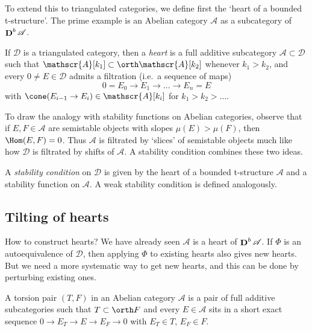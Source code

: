 To extend this to triangulated categories, we define first the `heart of a
bounded t-structure'. The prime example is an Abelian category \(\mathscr{A}\)
as a subcategory of \(\mathop{\mathbf{D}}^b \mathscr{A}\).

\begin{definition}
    If \(\mathscr{D}\) is a triangulated category, then a \textit{heart} is a
    full additive subcategory \(\mathscr{A}\subset \mathscr{D}\) such that
    \(\mathscr{A}[k_1]\subset \orth\mathscr{A}[k_2]\)  whenever \(k_1>k_2\),
    and every \(0\neq E\in \mathscr{D}\) admits a filtration (i.e.\ a sequence
    of maps)
    \[
        0=E_0\to E_1\to ... \to E_n = E
    \]
    with \(\cone(E_{i-1}\to E_i)\in \mathscr{A}[k_i]\) for \(k_1>k_2>...\).
\end{definition}

To draw the analogy with stability functions on Abelian categories, observe
that if \(E,F\in \mathscr{A}\) are semistable objects with slopes
\(\mu(E)>\mu(F)\), then \(\Hom(E,F)=0\). Thus \(\mathscr{A}\) is filtrated by
`slices' of semistable objects much like how \(\mathscr{D}\) is filtrated by
shifts of \(\mathscr{A}\). A stability condition combines these two ideas.

\begin{definition}
    A \textit{stability condition} on \(\mathscr{D}\) is given by the heart of a
    bounded t-structure \(\mathscr{A}\) and a stability function on
    \(\mathscr{A}\). A weak stability condition is defined analogously.
\end{definition}

\subsection{Tilting of hearts} How to construct hearts? We have already seen
\(\mathscr{A}\) is a heart of \(\mathop{\mathbf{D}}^b\mathscr{A}\). If \(\Phi\) is an
autoequivalence of \(\mathscr{D}\), then applying \(\Phi\) to existing hearts
also gives new hearts. But we need a more systematic way to get new hearts, and
this can be done by perturbing existing ones.

\begin{definition}
    A torsion pair \((T,F)\) in an Abelian category \(\mathscr{A}\)  is a pair
    of full additive subcategories such that \(T\subset \orth F\) and every
    \(E\in \mathscr{A}\) sits in a short exact sequence \(0\to E_T\to E\to
    E_F\to 0\) with \(E_T\in T\), \(E_F\in F\).
\end{definition}


